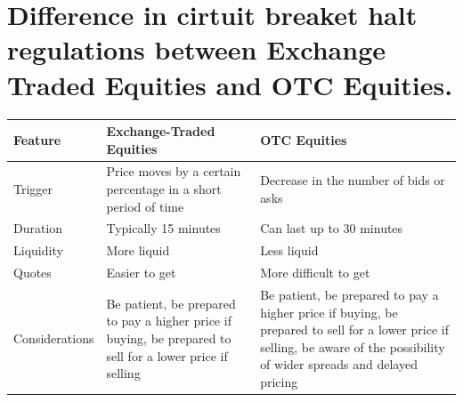 \documentclass[11pt]{article}
\begin{document}
\section{Difference in cirtuit breaket halt regulations  between Exchange Traded Equities and OTC Equities.}
\label{sec:orgdaeacbe}
\begin{center}
\begin{tabular}{lll}
\hline
Feature & Exchange-Traded Equities & OTC Equities\\[0pt]
\hline
Trigger & Price moves by a certain percentage in a short period of time & Decrease in the number of bids or asks\\[0pt]
Duration & Typically 15 minutes & Can last up to 30 minutes\\[0pt]
Liquidity & More liquid & Less liquid\\[0pt]
Quotes & Easier to get & More difficult to get\\[0pt]
Considerations & Be patient, be prepared to pay a higher price if buying, be prepared to sell for a lower price if selling & Be patient, be prepared to pay a higher price if buying, be prepared to sell for a lower price if selling, be aware of the possibility of wider spreads and delayed pricing\\[0pt]
\hline
\end{tabular}
\end{center}
\end{document}
